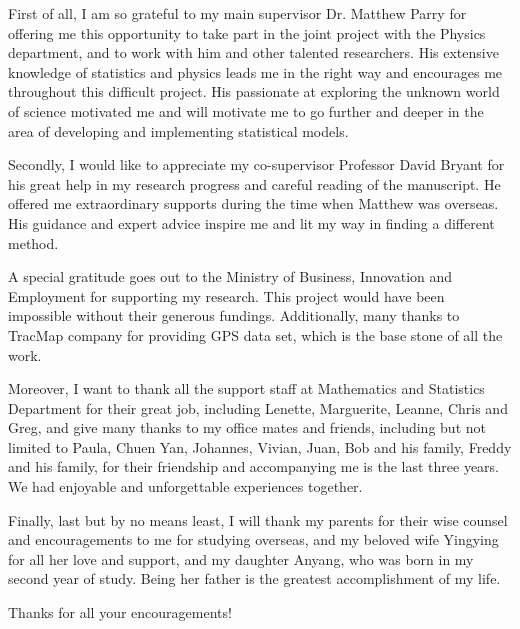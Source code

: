 First of all, I am so grateful to my main supervisor Dr. Matthew Parry for offering me this opportunity to take part in the joint project with the Physics department, and to work with him and other talented researchers. His extensive knowledge of statistics and physics leads me in the right way and encourages me throughout this difficult project. His passionate at exploring the unknown world of science motivated me and will motivate me to go further and deeper in the area of developing and implementing statistical models.  

Secondly, I would like to appreciate my co-supervisor Professor David Bryant for his great help in my research progress and careful reading of the manuscript. He offered me extraordinary supports during the time when Matthew was overseas. His guidance and expert advice inspire me and lit my way in finding a different method. 

A special gratitude goes out to the Ministry of Business, Innovation and Employment for supporting my research. This project would have been impossible without their generous fundings. Additionally, many thanks to TracMap company for providing GPS data set, which is the base stone of all the work. 

Moreover, I want to thank all the support staff at Mathematics and Statistics Department for their great job, including Lenette, Marguerite, Leanne, Chris and Greg, and give many thanks to my office mates and friends, including but not limited to Paula, Chuen Yan, Johannes, Vivian, Juan, Bob and his family, Freddy and his family, for their friendship and accompanying me is the last three years. We had enjoyable and unforgettable experiences together. 

Finally, last but by no means least, I will thank my parents for their wise counsel and encouragements to me for studying overseas, and my beloved wife Yingying for all her love and support, and my daughter Anyang, who was born in my second year of study. Being her father is the greatest accomplishment of my life.

Thanks for all your encouragements! 

